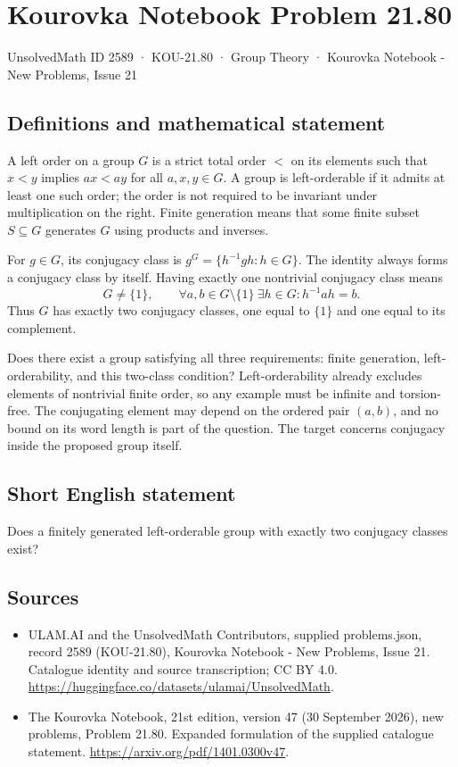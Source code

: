 \documentclass[11pt,a4paper]{article}
\begin{document}
\section*{Kourovka Notebook Problem 21.80}\label{2589}
{\small UnsolvedMath ID 2589 · KOU-21.80 · Group Theory · Kourovka Notebook - New Problems, Issue 21}
\subsection{Definitions and mathematical statement}
A left order on a group $G$ is a strict total order $<$ on its elements such that $x<y$ implies $ax<ay$ for all $a,x,y\in G$. A group is left-orderable if it admits at least one such order; the order is not required to be invariant under multiplication on the right. Finite generation means that some finite subset $S\subseteq G$ generates $G$ using products and inverses.

For $g\in G$, its conjugacy class is $g^G=\{h^{-1}gh:h\in G\}$. The identity always forms a conjugacy class by itself. Having exactly one nontrivial conjugacy class means
\[
 G\ne\{1\},\qquad
 \forall a,b\in G\setminus\{1\}\ \exists h\in G:
 h^{-1}ah=b.
\]
Thus $G$ has exactly two conjugacy classes, one equal to $\{1\}$ and one equal to its complement.

Does there exist a group satisfying all three requirements: finite generation, left-orderability, and this two-class condition? Left-orderability already excludes elements of nontrivial finite order, so any example must be infinite and torsion-free. The conjugating element may depend on the ordered pair $(a,b)$, and no bound on its word length is part of the question. The target concerns conjugacy inside the proposed group itself.
\subsection{Short English statement}
Does a finitely generated left-orderable group with exactly two conjugacy classes exist?
\subsection{Sources}
\begin{itemize}
\item[S1] ULAM.AI and the UnsolvedMath Contributors, supplied problems.json, record 2589 (KOU-21.80), Kourovka Notebook - New Problems, Issue 21. Catalogue identity and source transcription; CC BY 4.0.
\url{https://huggingface.co/datasets/ulamai/UnsolvedMath}.
\item[S2] The Kourovka Notebook, 21st edition, version 47 (30 September 2026), new problems, Problem 21.80. Expanded formulation of the supplied catalogue statement.
\url{https://arxiv.org/pdf/1401.0300v47}.
\end{itemize}
\end{document}
